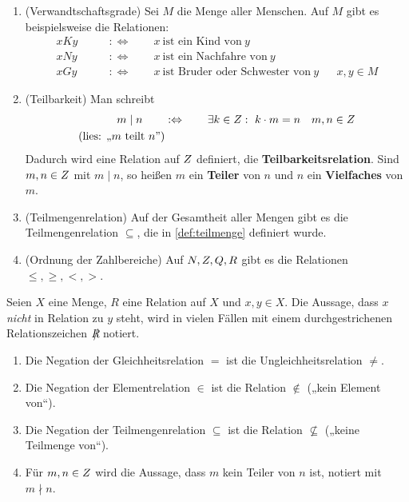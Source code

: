 \begin{bsp} \label{bsp:relation}   \quad
    \begin{enumerate}
        \item(Verwandtschaftsgrade) Sei $M$ die Menge aller Menschen. Auf $M$ gibt es beispielsweise die Relationen:
        \begin{align*}
            xKy \qquad&:\Leftrightarrow\qquad x\ \text{ist ein Kind von}\ y && \\
            xNy \qquad&:\Leftrightarrow\qquad x\ \text{ist ein Nachfahre von}\ y && \\
            xGy \qquad&:\Leftrightarrow\qquad x\ \text{ist Bruder oder Schwester von}\ y && x,y\in M
        \end{align*}
        \item(Teilbarkeit) Man schreibt
        \begin{align*}
            m \mid n \qquad& :\Leftrightarrow\qquad \exists k\in \relax Z:\ k\cdot m=n && m,n\in \relax Z \\
            (\text{lies: „$m$ teilt $n$”})
        \end{align*}
        Dadurch wird eine Relation auf $\relax Z$ definiert, die \textbf{Teilbarkeitsrelation}. Sind $m,n\in \relax Z$ mit $m\mid n$, so heißen $m$ ein \textbf{Teiler} von $n$ und $n$ ein \textbf{Vielfaches} von $m$.
        \item(Teilmengenrelation) Auf der Gesamtheit aller Mengen gibt es die Teilmengenrelation $\subseteq$, die in \cref{def:teilmenge} definiert wurde.
        \item(Ordnung der Zahlbereiche) Auf $\relax N,\relax Z,\relax Q,\relax R$ gibt es die Relationen $\le, \ge, <, >$.
    \end{enumerate}
\end{bsp}


\begin{nota}
    Seien $X$ eine Menge, $R$ eine Relation auf $X$ und $x,y\in X$. Die Aussage, dass $x$ \emph{nicht} in Relation zu $y$ steht, wird in vielen Fällen mit einem durchgestrichenen Relationszeichen $R\mkern-11mu/$ notiert.
\end{nota}


\begin{bsp} \quad
    \begin{enumerate}
        \item Die Negation der Gleichheitsrelation $=$ ist die Ungleichheitsrelation $\neq$.
        \item Die Negation der Elementrelation $\in$ ist die Relation $\notin$ („kein Element von“).
        \item Die Negation der Teilmengenrelation $\subseteq$ ist die Relation $\nsubseteq$ („keine Teilmenge von“).
        \item Für $m,n\in \relax Z$ wird die Aussage, dass $m$ kein Teiler von $n$ ist, notiert mit $m\nmid n$.
    \end{enumerate}
\end{bsp}


